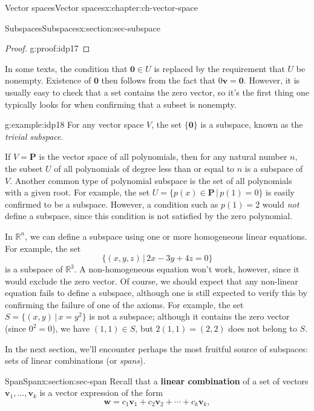 \documentclass[oneside,10pt,]{book}
\newcommand{\terminology}[1]{\textbf{#1}}
\numberwithin{equation}{section}
\newcommand{\R}{\mathbb{R}}
\newcommand{\vv}{\mathbf{v}}
\newcommand{\ww}{\mathbf{w}}
\newcommand{\zer}{\mathbf{0}}
\begin{document}
\begin{chapterptx}{Vector spaces}{}{Vector spaces}{}{}{x:chapter:ch-vector-space}
\begin{sectionptx}{Subspaces}{}{Subspaces}{}{}{x:section:sec-subspace}
\begin{proof}{}{g:proof:idp17}
\end{proof}
In some texts, the condition that \(\zer\in U\) is replaced by the requirement that \(U\) be nonempty. Existence of \(\zer\) then follows from the fact that \(0\vv=\zer\). However, it is usually easy to check that a set contains the zero vector, so it's the first thing one typically looks for when confirming that a subset is nonempty.%
\begin{example}{}{g:example:idp18}%
For any vector space \(V\), the set \(\{\zer\}\) is a subspace, known as the \emph{trivial subspace}.%
\par
If \(V=\mathbf{P}\) is the vector space of all polynomials, then for any natural number \(n\), the subset \(U\) of all polynomials of degree less than or equal to \(n\) is a subspace of \(V\). Another common type of polynomial subspace is the set of all polynomials with a given root. For example, the set \(U=\{p(x)\in\mathbf{P}\,|\,p(1)=0\}\) is easily confirmed to be a subspace. However, a condition such as \(p(1)=2\) would \emph{not} define a subspace, since this condition is not satisfied by the zero polynomial.%
\par
In \(\R^n\), we can define a subspace using one or more homogeneous linear equations. For example, the set%
\begin{equation*}
\{(x,y,z)\,|\, 2x-3y+4z=0\}
\end{equation*}
is a subspace of \(\R^3\). A non-homogeneous equation won't work, however, since it would exclude the zero vector. Of course, we should expect that any non-linear equation fails to define a subspace, although one is still expected to verify this by confirming the failure of one of the axioms. For example, the set \(S=\{(x,y)\,|\,x=y^2\}\) is not a subspace; although it contains the zero vector (since \(0^2=0\)), we have \((1,1)\in S\), but \(2(1,1)=(2,2)\) does not belong to \(S\).%
\end{example}
In the next section, we'll encounter perhaps the most fruitful source of subspaces: sets of linear combinations (or \emph{spans}).%
\end{sectionptx}
%
%
\typeout{************************************************}
\typeout{************************************************}
%
\begin{sectionptx}{Span}{}{Span}{}{}{x:section:sec-span}
Recall that a \terminology{linear combination} of a set of vectors \(\vv_1,\ldots, \vv_k\) is a vector expression of the form%
\begin{equation*}
\ww=c_1\vv_1+c_2\vv_2+\cdots +c_k\vv_k,

\end{equation*}
\end{sectionptx}
\end{chapterptx}
\end{document}
